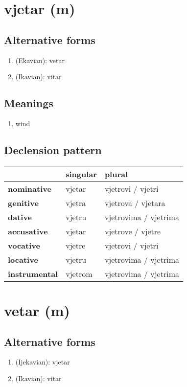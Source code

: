 \filbreak
\section{vjetar (m)}
\subsection*{Alternative forms}
\begin{enumerate}
\item (Ekavian): vetar
\item (Ikavian): vitar
\end{enumerate}
\subsection*{Meanings}
\begin{enumerate}
\item wind
\end{enumerate}
\subsection*{Declension pattern}
\begin{tabularx}{\linewidth}{Xll}
\toprule
{} & singular &                 plural \\
\midrule
\textbf{nominative  } &   vjetar &      vjetrovi / vjetri \\
\textbf{genitive    } &   vjetra &     vjetrova / vjetara \\
\textbf{dative      } &   vjetru &  vjetrovima / vjetrima \\
\textbf{accusative  } &   vjetar &      vjetrove / vjetre \\
\textbf{vocative    } &   vjetre &      vjetrovi / vjetri \\
\textbf{locative    } &   vjetru &  vjetrovima / vjetrima \\
\textbf{instrumental} &  vjetrom &  vjetrovima / vjetrima \\
\bottomrule
\end{tabularx}

\filbreak
\section{vetar (m)}
\subsection*{Alternative forms}
\begin{enumerate}
\item (Ijekavian): vjetar
\item (Ikavian): vitar
\end{enumerate}
